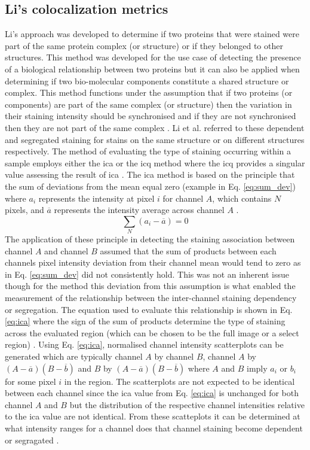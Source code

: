 \subsection{Li's colocalization metrics}
Li's approach \cite{Li4070} was developed to determine if two proteins that were stained were part of the same protein complex (or structure) or if they belonged to other structures. This method was developed for the use case of detecting the presence of a biological relationship between two proteins but it can also be applied when determining if two bio-molecular components constitute a shared structure or complex. This method functions under the assumption that if two proteins (or components) are part of the same complex (or structure) then the variation in their staining intensity should be synchronised and if they are not synchronised then they are not part of the same complex \cite{Li4070}. Li et al. \cite{Li4070} referred to these dependent and segregated staining for stains on the same structure or on different structures respectively. The method of evaluating the type of staining occurring within a sample employs either the \gls{ica} or the \gls{icq} method where the \gls{icq} provides a singular value assessing the result of \gls{ica} \cite[p. 4079]{Li4070}. The \gls{ica} method is based on the principle that the sum of deviations from the mean equal zero (example in Eq. \ref{eq:sum_dev}) where  $a_i$ represents the intensity at pixel $i$ for channel $A$, which contains $N$ pixels, and $\overline{a}$ represents the intensity average across channel $A$ \cite[p. 4073]{Li4070}.
\begin{equation} \label{eq:sum_dev}
    \sum_N (a_i -\overline{a}) = 0
\end{equation}
The application of these principle in detecting the staining association between channel $A$ and channel $B$ assumed that the sum of products between each channels pixel intensity deviation from their channel mean would tend to zero as in Eq. \ref{eq:sum_dev} did not consistently hold. This was not an inherent issue though for the method this deviation from this assumption is what enabled the measurement of the relationship between the inter-channel staining dependency or segregation. The equation used to evaluate this relationship is shown in Eq. \ref{eq:ica} where the sign of the sum of products determine the type of staining across the evaluated region (which can be chosen to be the full image or a select region) \cite[p. 4073]{Li4070}. Using Eq. \ref{eq:ica}, normalised channel intensity scatterplots can be generated which are typically channel $A$ by channel $B$, channel $A$ by $(A-\overline{a})(B-\overline{b})$ and $B$ by $(A-\overline{a})(B-\overline{b})$ where $A$ and $B$ imply $a_i$ or $b_i$ for some pixel $i$ in the region. The scatterplots are not expected to be identical between each channel since the \gls{ica} value from Eq. \ref{eq:ica} is unchanged for both channel $A$ and $B$ but the distribution of the respective channel intensities relative to the \gls{ica} value are not identical. From these scatteplots it can be determined at what intensity ranges for a channel does that channel staining become dependent or segragated \cite{Li4070}.\par
